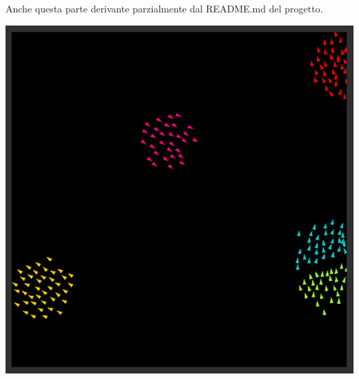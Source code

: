 \documentclass[10pt,a4paper]{article}
\begin{document}
Anche questa parte derivante parzialmente dal README.md del progetto.





\begin{center}
    \includegraphics[width=1.0\textwidth]{../images/interface.png}
\end{center}
\end{document}
